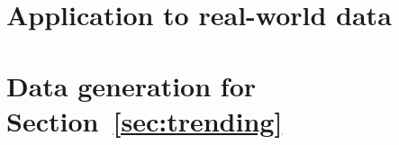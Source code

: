 \documentclass[oneside]{article}
\theoremstyle{plain}%
\theoremstyle{definition}
\begin{document}
\section{Application to real-world data} \label{sec:application}


\printbibliography

\appendix
\section{Data generation for Section~\ref{sec:trending}}\label{sec:app-trending-data-generation}



\end{document}
